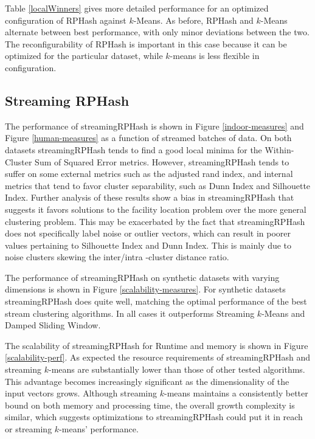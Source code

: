 Table \ref{localWinners} gives more detailed performance for an optimized configuration of \textsf{RPHash}
against $k$-Means.  As before, \textsf{RPHash} and $k$-Means alternate between best performance, with only
minor deviations between the two.  The reconfigurability of \textsf{RPHash} is important in this case because
it can be optimized for the particular dataset, while $k$-means is less flexible in configuration.

\subsection{Streaming RPHash}

The performance of \textsf{streamingRPHash} is shown in Figure \ref{indoor-measures} and
Figure \ref{human-measures} as a function of streamed batches of data.  On both datasets
\textsf{streamingRPHash} tends to find a good local minima for the Within-Cluster Sum of Squared
Error metrics.  However, \textsf{streamingRPHash} tends to suffer on some external metrics such as
the adjusted rand index, and internal metrics that tend to favor cluster separability, such as Dunn
Index and Silhouette Index.  Further analysis of these results show a bias in
\textsf{streamingRPHash} that suggests it favors solutions to the facility location problem over the
more general clustering problem.  This may be exacerbated by the fact that \textsf{streamingRPHash}
does not specifically label noise or outlier vectors, which can result in poorer values pertaining
to Silhouette Index and Dunn Index.  This is mainly due to noise clusters skewing the inter/intra
-cluster distance ratio.

The performance of \textsf{streamingRPHash} on synthetic datasets with varying dimensions is shown in
Figure \ref{scalability-measures}.  For synthetic datasets \textsf{streamingRPHash} does quite well,
matching the optimal performance of the best stream clustering algorithms. In all cases it
outperforms Streaming $k$-Means and Damped Sliding Window.

The scalability of \textsf{streamingRPHash} for Runtime and memory is shown in Figure
\ref{scalability-perf}.  As expected the resource requirements of \textsf{streamingRPHash} and
streaming $k$-means are substantially lower than those of other tested algorithms.  This advantage
becomes increasingly significant as the dimensionality of the input vectors grows.  Although
streaming $k$-means maintains a consistently better bound on both memory and processing time, the
overall growth complexity is similar, which suggests optimizations to \textsf{streamingRPHash} could
put it in reach or streaming $k$-means' performance.


